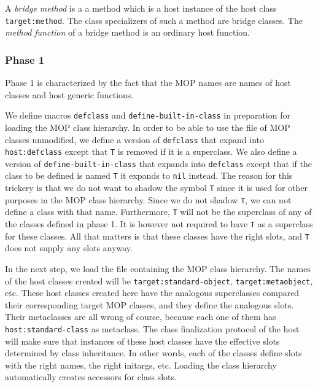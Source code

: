 \begin{definition}
A \emph{bridge method} is a a method which is a host instance of the host
class \texttt{target:method}.  The class specializers of such a method are
bridge classes.  The \emph{method function} of a bridge method is an
ordinary host function.
\end{definition}

\subsubsection{Phase 1}

Phase 1 is characterized by the fact that the MOP names are names of
host classes and host generic functions.  

We define macros \texttt{defclass} and \texttt{define-built-in-class}
in preparation for loading the MOP class hierarchy.  In order to be
able to use the file of MOP classes unmodified, we define a version of
\texttt{defclass} that expand into \texttt{host:defclass} except that
\texttt{T} is removed if it is a superclass.  We also define a version
of \texttt{define-built-in-class} that expands into \texttt{defclass}
except that if the class to be defined is named \texttt{T} it expands
to \texttt{nil} instead.  The reason for this trickery is that we do
not want to shadow the symbol \texttt{T} since it is used for other
purposes in the MOP class hierarchy.  Since we do not shadow
\texttt{T}, we can not define a class with that name.  Furthermore,
\texttt{T} will not be the superclass of any of the classes defined in
phase 1.  It is however not required to have \texttt{T} as a
superclass for these classes.  All that matters is that these classes
have the right slots, and \texttt{T} does not supply any slots anyway.

In the next step, we load the file containing the MOP class hierarchy.
The names of the host classes created will be
\texttt{target:standard-object}, \texttt{target:metaobject}, etc.
These host classes created here have the analogous superclasses
compared their corresponding target MOP classes, and they define the
analogous slots.  Their metaclasses are all wrong of course, because
each one of them has \texttt{host:standard-class} as metaclass.  The
class finalization protocol of the host will make sure that instances
of these host classes have the effective slots determined by class
inheritance.  In other words, each of the classes define slots with
the right names, the right initargs, etc.  Loading the class hierarchy
automatically creates accessors for class slots. 

